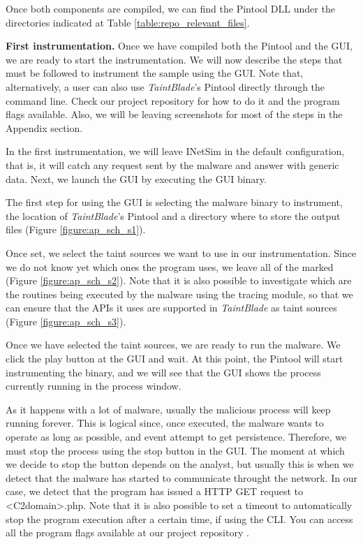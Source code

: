 \documentclass[conference]{IEEEtran}
\begin{document}
Once both components are compiled, we can find the Pintool DLL under the directories indicated at Table \ref{table:repo_relevant_files}.

\textbf{First instrumentation.}
Once we have compiled both the Pintool and the GUI, we are ready to start the instrumentation. We will
now describe the steps that must be followed to instrument the sample using the GUI. Note that, alternatively,
a user can also use \textit{TaintBlade}'s Pintool directly through the command line. Check our project repository for
how to do it and the program flags available. Also, we will be leaving screenshots for most of the steps in 
the Appendix section.

In the first instrumentation, we will leave INetSim in the default configuration, that is, it will catch
any request sent by the malware and answer with generic data. Next, we launch the GUI by executing the GUI binary.

The first step for using the GUI is selecting the malware binary to instrument, the location of \textit{TaintBlade}'s
Pintool and a directory where to store the output files (Figure \ref{figure:ap_sch_s1}).

Once set, we select the taint sources we want to use in our instrumentation. Since we do not know yet
which ones the program uses, we leave all of the marked (Figure \ref{figure:ap_sch_s2}). Note that it
is also possible to investigate which are the routines being executed by the malware using the tracing module,
so that we can ensure that the APIs it uses are supported in \textit{TaintBlade} as taint sources (Figure
\ref{figure:ap_sch_s3}).

Once we have selected the taint sources, we are ready to run the malware. We click the play button at the GUI
and wait. At this point, the Pintool will start instrumenting the binary, and we will see that the GUI
shows the process currently running in the process window. 

As it happens with a lot of malware, usually the malicious process will keep running forever. This is logical
since, once executed, the malware wants to operate as long as possible, and event attempt to get persistence.
Therefore, we must stop the process using the stop button in the GUI. The moment at which we decide to stop
the button depends on the analyst, but usually this is when we detect that the malware has started to communicate
throught the network. In our case, we detect that the program has issued a HTTP GET request to \textless C2domain\textgreater.php.
Note that it is also possible to set a timeout to automatically stop the program execution after
a certain time, if using the CLI. You can access all the program flags available at our project repository .
\end{document}
